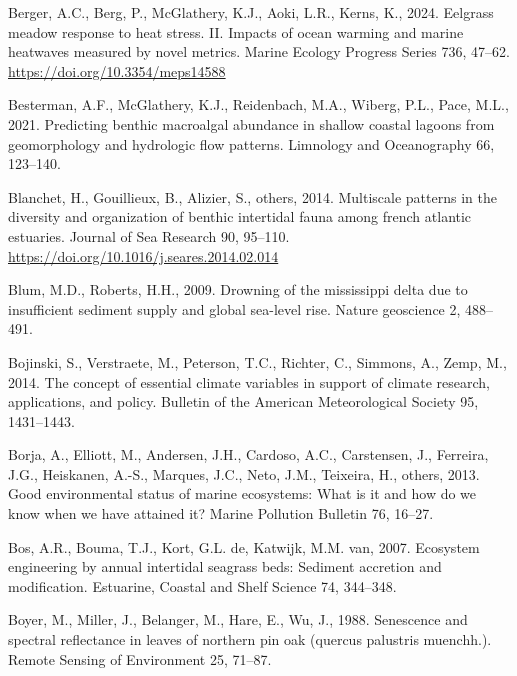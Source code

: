 \documentclass[
  letterpaper,
  11pt,
  english,
  singlespacing,
  headsepline]{MastersDoctoralThesis}
\newlength{\cslhangindent}
\newenvironment{CSLReferences}[2] %
 {\begin{list}{}{%
  \setlength{\itemindent}{0pt}
  \setlength{\leftmargin}{0pt}
  \setlength{\parsep}{0pt}
  \ifodd #1
   \setlength{\leftmargin}{\cslhangindent}
   \setlength{\itemindent}{-1\cslhangindent}
  \fi
  \setlength{\itemsep}{#2\baselineskip}}}
 {\end{list}}
\begin{document}
\begin{CSLReferences}{1}{0}
Berger, A.C., Berg, P., McGlathery, K.J., Aoki, L.R., Kerns, K., 2024.
Eelgrass meadow response to heat stress. II. Impacts of ocean warming
and marine heatwaves measured by novel metrics. Marine Ecology Progress
Series 736, 47--62. \url{https://doi.org/10.3354/meps14588}

Besterman, A.F., McGlathery, K.J., Reidenbach, M.A., Wiberg, P.L., Pace,
M.L., 2021. Predicting benthic macroalgal abundance in shallow coastal
lagoons from geomorphology and hydrologic flow patterns. Limnology and
Oceanography 66, 123--140.

Blanchet, H., Gouillieux, B., Alizier, S., others, 2014. Multiscale
patterns in the diversity and organization of benthic intertidal fauna
among french atlantic estuaries. Journal of Sea Research 90, 95--110.
\url{https://doi.org/10.1016/j.seares.2014.02.014}

Blum, M.D., Roberts, H.H., 2009. Drowning of the mississippi delta due
to insufficient sediment supply and global sea-level rise. Nature
geoscience 2, 488--491.

Bojinski, S., Verstraete, M., Peterson, T.C., Richter, C., Simmons, A.,
Zemp, M., 2014. The concept of essential climate variables in support of
climate research, applications, and policy. Bulletin of the American
Meteorological Society 95, 1431--1443.

Borja, A., Elliott, M., Andersen, J.H., Cardoso, A.C., Carstensen, J.,
Ferreira, J.G., Heiskanen, A.-S., Marques, J.C., Neto, J.M., Teixeira,
H., others, 2013. Good environmental status of marine ecosystems: What
is it and how do we know when we have attained it? Marine Pollution
Bulletin 76, 16--27.

Bos, A.R., Bouma, T.J., Kort, G.L. de, Katwijk, M.M. van, 2007.
Ecosystem engineering by annual intertidal seagrass beds: Sediment
accretion and modification. Estuarine, Coastal and Shelf Science 74,
344--348.

Boyer, M., Miller, J., Belanger, M., Hare, E., Wu, J., 1988. Senescence
and spectral reflectance in leaves of northern pin oak (quercus
palustris muenchh.). Remote Sensing of Environment 25, 71--87.


\end{CSLReferences}
\end{document}
